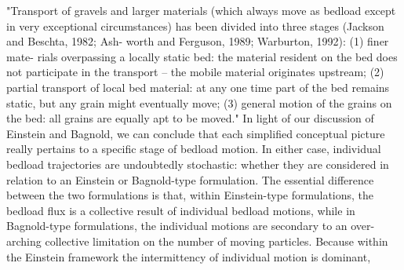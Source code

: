 \documentclass{article}
\begin{document}
"Transport of gravels and larger materials (which always move as bedload except in very exceptional circumstances) has been divided into three stages (Jackson and Beschta, 1982; Ash- worth and Ferguson, 1989; Warburton, 1992): (1) finer mate- rials overpassing a locally static bed: the material resident on the bed does not participate in the transport – the mobile material originates upstream; (2) partial transport of local bed material: at any one time part of the bed remains static, but any grain might eventually move; (3) general motion of the grains on the bed: all grains are equally apt to be moved."
In light of our discussion of Einstein and Bagnold, we can conclude that each simplified conceptual picture really pertains to a specific stage of bedload motion. 
In either case, individual bedload trajectories are undoubtedly stochastic: whether they are considered in relation to an Einstein or Bagnold-type formulation. 
The essential difference between the two formulations is that, within Einstein-type formulations, the bedload flux is a collective result of individual bedload motions, while in Bagnold-type formulations, the individual motions are secondary to an over-arching collective limitation on the number of moving particles. 
Because within the Einstein framework the intermittency of individual motion is dominant,
\end{document}
